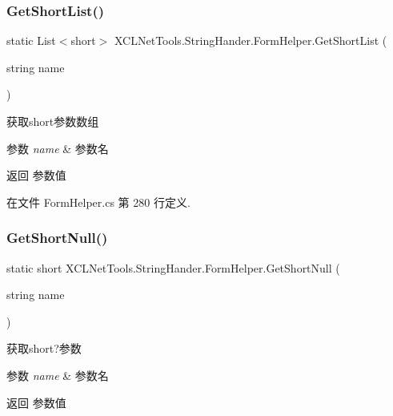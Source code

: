 \subsubsection{\texorpdfstring{Get\+Short\+List()}{GetShortList()}}
{\footnotesize\ttfamily static List$<$short$>$ X\+C\+L\+Net\+Tools.\+String\+Hander.\+Form\+Helper.\+Get\+Short\+List (\begin{DoxyParamCaption}\item[{string}]{name }\end{DoxyParamCaption})\hspace{0.3cm}{\ttfamily [static]}}



获取short参数数组 


\begin{DoxyParams}{参数}
{\em name} & 参数名\\
\hline
\end{DoxyParams}
\begin{DoxyReturn}{返回}
参数值
\end{DoxyReturn}


在文件 Form\+Helper.\+cs 第 280 行定义.

\mbox{\label{class_x_c_l_net_tools_1_1_string_hander_1_1_form_helper_afe30b64436d0a1831330cd390f3f4b51}} 
\subsubsection{\texorpdfstring{Get\+Short\+Null()}{GetShortNull()}\hspace{0.1cm}{\footnotesize\ttfamily [1/2]}}
{\footnotesize\ttfamily static short X\+C\+L\+Net\+Tools.\+String\+Hander.\+Form\+Helper.\+Get\+Short\+Null (\begin{DoxyParamCaption}\item[{string}]{name }\end{DoxyParamCaption})\hspace{0.3cm}{\ttfamily [static]}}



获取short?参数 


\begin{DoxyParams}{参数}
{\em name} & 参数名\\
\hline
\end{DoxyParams}
\begin{DoxyReturn}{返回}
参数值
\end{DoxyReturn}


